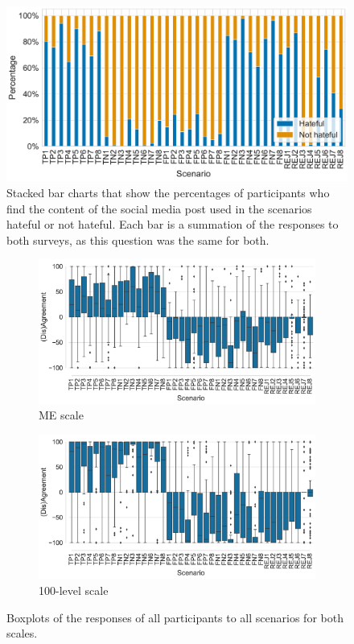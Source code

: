 %
\begin{figure}[t]
    \centering
    \includegraphics[scale=.4]{Figures/hatefulness.pdf}
    \caption{Stacked bar charts that show the percentages of participants who find the content of the social media post used in the scenarios hateful or not hateful. Each bar is a summation of the responses to both surveys, as this question was the same for both.}
    \label{fig:hatefulness}
\end{figure}
\begin{figure}[h]
    \centering
    \begin{subfigure}[b]{\textwidth}
        \centering
        \includegraphics[scale=.4]{Figures/boxplots-ME.pdf}
        \caption{ME scale}
        \label{fig:boxplots-me}
    \end{subfigure}
    \begin{subfigure}[b]{\textwidth}
        \centering
        \includegraphics[scale=.4]{Figures/boxplots-100-level.pdf}
        \caption{100-level scale}
        \label{fig:boxplots-100-level}
    \end{subfigure}
    \caption{Boxplots of the responses of all participants to all scenarios for both scales.}
    \label{fig:boxplots}
\end{figure}

